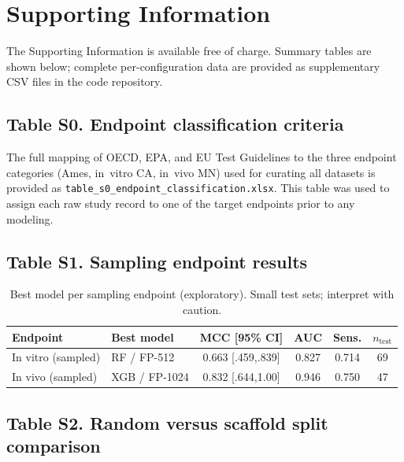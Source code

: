 \section*{Supporting Information}

The Supporting Information is available free of charge. Summary tables are shown below; complete per-configuration data are provided as supplementary CSV files in the code repository.

\subsection*{Table S0. Endpoint classification criteria}

The full mapping of OECD, EPA, and EU Test Guidelines to the three endpoint categories (Ames, in~vitro CA, in~vivo MN) used for curating all datasets is provided as \texttt{table\_s0\_endpoint\_classification.xlsx}. This table was used to assign each raw study record to one of the target endpoints prior to any modeling.

\subsection*{Table S1. Sampling endpoint results}

\begin{table}[ht]
\caption{Best model per sampling endpoint (exploratory). Small test sets; interpret with caution.}
\centering
\small
\begin{tabular}{@{}llcccc@{}}
\toprule
Endpoint & Best model & MCC [95\% CI] & AUC & Sens. & $n_{\text{test}}$ \\
\midrule
In vitro (sampled) & RF / FP-512 & 0.663 [.459,.839] & 0.827 & 0.714 & 69 \\
In vivo (sampled) & XGB / FP-1024 & 0.832 [.644,1.00] & 0.946 & 0.750 & 47 \\
\bottomrule
\end{tabular}
\end{table}

\subsection*{Table S2. Random versus scaffold split comparison}


